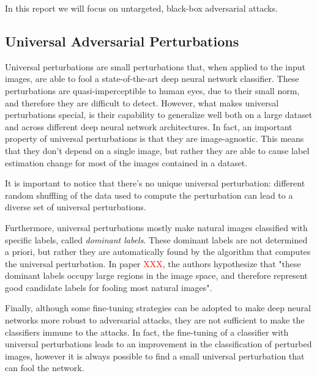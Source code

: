 In this report we will focus on untargeted, black-box adversarial attacks.

\subsection{Universal Adversarial Perturbations}
Universal perturbations are small perturbations that, when applied to the input images, are able
to fool a state-of-the-art deep neural network classifier. These perturbations are quasi-imperceptible to human eyes,
due to their small norm, and therefore they are difficult to detect. However, what makes universal perturbations special,
is their capability to generalize well both on a large dataset and across different deep neural network architectures.
In fact, an important property of universal perturbations is that they are image-agnostic. This means that
they don't depend on a single image, but rather they are able to cause label estimation change for most of
the images contained in a dataset.

It is important to notice that there's no unique universal perturbation: different random shuffling of the data used
to compute the perturbation can lead to a diverse set of universal perturbations.

Furthermore, universal perturbations mostly make natural images classified with specific labels, called
\textit{dominant labels}. These dominant labels are not determined a priori, but rather they are automatically
found by the algorithm that computes the universal perturbation. In paper \textcolor{red}{XXX}, the authors
hypothesize that "these dominant labels occupy large regions in the image space, and therefore represent good
candidate labels for fooling most natural images".

Finally, although some fine-tuning strategies can be adopted to make deep neural networks more robust to adversarial
attacks, they are not sufficient to make the classifiers immune to the attacks. In fact, the fine-tuning of a classifier
with universal perturbations leads to an improvement in the classification of perturbed images, however it is always
possible to find a small universal perturbation that can fool the network.





